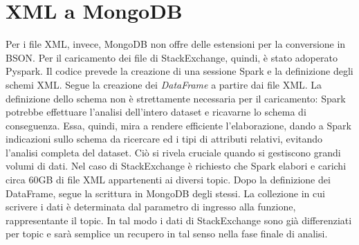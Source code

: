 \section{XML a MongoDB}
Per i file XML, invece, MongoDB non offre delle estensioni per la conversione in BSON. Per il caricamento dei file di StackExchange, quindi, è stato adoperato Pyspark. Il codice prevede la creazione di una sessione Spark e la definizione degli schemi XML. Segue la creazione dei \emph{DataFrame} a partire dai file XML. La definizione dello schema non è strettamente necessaria per il caricamento: Spark potrebbe effettuare l'analisi dell'intero dataset e ricavarne lo schema di conseguenza. Essa, quindi, mira a rendere efficiente l'elaborazione, dando a Spark indicazioni sullo schema da ricercare ed i tipi di attributi relativi, evitando l'analisi completa del dataset. Ciò si rivela cruciale quando si gestiscono grandi volumi di dati. Nel caso di StackExchange è richiesto che Spark elabori e carichi circa 60GB di file XML appartenenti ai diversi topic. Dopo la definizione dei DataFrame, segue la scrittura in MongoDB degli stessi. La collezione in cui scrivere i dati è determinata dal parametro di ingresso alla funzione, rappresentante il topic. In tal modo i dati di StackExchange sono già differenziati per topic e sarà semplice un recupero in tal senso nella fase finale di analisi.
